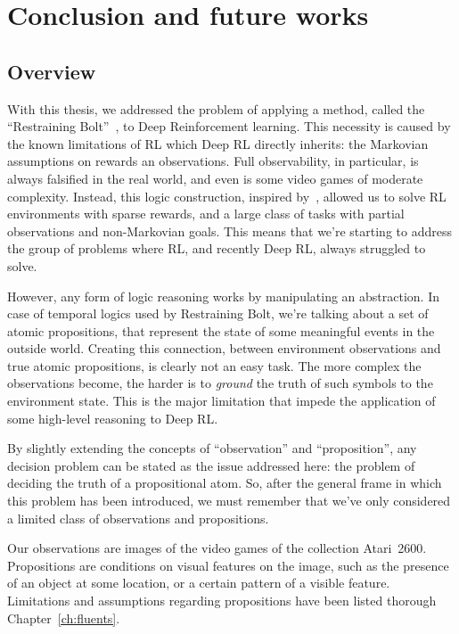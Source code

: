 \chapter{Conclusion and future works}

\label{ch:conclusions}


\section{Overview}

With this thesis, we addressed the problem of applying a method, called the
``Restraining Bolt''~\cite{bib:bolt}, to Deep Reinforcement learning. This
necessity is caused by the known limitations of RL which Deep RL directly
inherits: the Markovian assumptions on rewards an observations. Full
observability, in particular, is always falsified in the real world, and even
is some video games of moderate complexity. Instead, this logic construction,
inspired by~\cite{bib:nmrdp-logic-first}, allowed us to solve RL environments
with sparse rewards, and a large class of tasks with partial observations and
non-Markovian goals. This means that we're starting to address the group of
problems where RL, and recently Deep RL, always struggled to solve.

However, any form of logic reasoning works by manipulating an abstraction. In
case of temporal logics used by Restraining Bolt, we're talking about a set of
atomic propositions, that represent the state of some meaningful events in the
outside world. Creating this connection, between environment observations and
true atomic propositions, is clearly not an easy task. The more complex the
observations become, the harder is to \emph{ground} the truth of such symbols
to the environment state. This is the major limitation that impede the
application of some high-level reasoning to Deep RL.

By slightly extending the concepts of ``observation'' and ``proposition'',
any decision problem can be stated as the issue addressed here: the problem of
deciding the truth of a propositional atom. So, after the general frame in
which this problem has been introduced, we must remember that we've only
considered a limited class of observations and propositions.

Our observations are images of the video games of the collection Atari~2600.
Propositions are conditions on visual features on the image, such as the
presence of an object at some location, or a certain pattern of a visible
feature. Limitations and assumptions regarding propositions have been listed
thorough Chapter~\ref{ch:fluents}.


